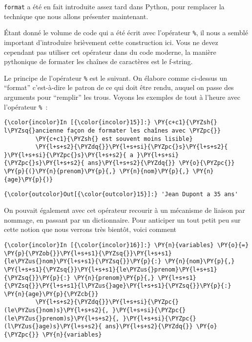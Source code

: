     \texttt{format} a été en fait introduite assez tard dans Python, pour
remplacer la technique que nous allons présenter maintenant.

Étant donné le volume de code qui a été écrit avec l'opérateur
\texttt{\%}, il nous a semblé important d'introduire brièvement cette
construction ici. Vous ne devez cependant pas utiliser cet opérateur
dans du code moderne, la manière pythonique de formater les chaînes de
caractères est le f-string.

    Le principe de l'opérateur \texttt{\%} est le suivant. On élabore comme
ci-dessus un ``format'' c'est-à-dire le patron de ce qui doit être
rendu, auquel on passe des arguments pour ``remplir'' les trous. Voyons
les exemples de tout à l'heure avec l'opérateur \texttt{\%}~:

    \begin{Verbatim}[commandchars=\\\{\}]
{\color{incolor}In [{\color{incolor}15}]:} \PY{c+c1}{\PYZsh{} l\PYZsq{}ancienne façon de formater les chaînes avec \PYZpc{}}
         \PY{c+c1}{\PYZsh{} est souvent moins lisible}
         \PY{l+s+s2}{\PYZdq{}}\PY{l+s+si}{\PYZpc{}s}\PY{l+s+s2}{ }\PY{l+s+si}{\PYZpc{}s}\PY{l+s+s2}{ a }\PY{l+s+si}{\PYZpc{}s}\PY{l+s+s2}{ ans}\PY{l+s+s2}{\PYZdq{}} \PY{o}{\PYZpc{}} \PY{p}{(}\PY{n}{prenom}\PY{p}{,} \PY{n}{nom}\PY{p}{,} \PY{n}{age}\PY{p}{)}
\end{Verbatim}


\begin{Verbatim}[commandchars=\\\{\}]
{\color{outcolor}Out[{\color{outcolor}15}]:} 'Jean Dupont a 35 ans'
\end{Verbatim}
            
    On pouvait également avec cet opérateur recourir à un mécanisme de
liaison par nommage, en passant par un dictionnaire. Pour anticiper un
tout petit peu sur cette notion que nous verrons très bientôt, voici
comment

    \begin{Verbatim}[commandchars=\\\{\}]
{\color{incolor}In [{\color{incolor}16}]:} \PY{n}{variables} \PY{o}{=} \PY{p}{\PYZob{}}\PY{l+s+s1}{\PYZsq{}}\PY{l+s+s1}{le\PYZus{}nom}\PY{l+s+s1}{\PYZsq{}}\PY{p}{:} \PY{n}{nom}\PY{p}{,} \PY{l+s+s1}{\PYZsq{}}\PY{l+s+s1}{le\PYZus{}prenom}\PY{l+s+s1}{\PYZsq{}}\PY{p}{:} \PY{n}{prenom}\PY{p}{,} \PY{l+s+s1}{\PYZsq{}}\PY{l+s+s1}{l\PYZus{}age}\PY{l+s+s1}{\PYZsq{}}\PY{p}{:} \PY{n}{age}\PY{p}{\PYZcb{}}
         \PY{l+s+s2}{\PYZdq{}}\PY{l+s+si}{\PYZpc{}(le\PYZus{}nom)s}\PY{l+s+s2}{, }\PY{l+s+si}{\PYZpc{}(le\PYZus{}prenom)s}\PY{l+s+s2}{, }\PY{l+s+si}{\PYZpc{}(l\PYZus{}age)s}\PY{l+s+s2}{ ans}\PY{l+s+s2}{\PYZdq{}} \PY{o}{\PYZpc{}} \PY{n}{variables}
\end{Verbatim}


